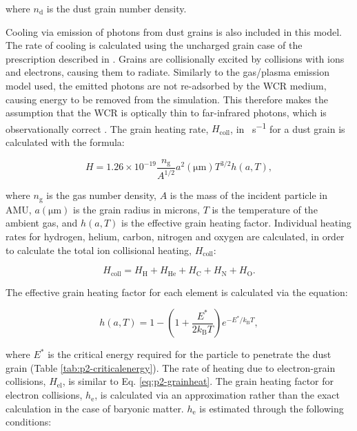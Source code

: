 \documentclass[fleqn,usenatbib]{mnras}
\newcommand{\rms}[1]{\ensuremath{_{\text{#1}}}}
\begin{document}
\noindent
where $n\rms{d}$ is the dust grain number density.

Cooling via emission of photons from dust grains is also included in this model.
The rate of cooling is calculated using the uncharged grain case of the prescription described in \cite{dwek_infrared_1981}.
Grains are collisionally excited by collisions with ions and electrons, causing them to radiate.
Similarly to the gas/plasma emission model used, the emitted photons are not re-adsorbed by the WCR medium, causing energy to be removed from the simulation.
This therefore makes the assumption that the WCR is optically thin to far-infrared photons, which is observationally correct \citep{monnierKeckAperturemaskingExperiment2007,soulainSPHEREViewWolfRayet2018,callinghamAnisotropicWindsWolf2019}.
The grain heating rate, $H\rms{coll}$, in \si{\erg\per\second} for a dust grain is calculated with the formula:

\begin{equation}
  \label{eq:p2-grainheat}
  H = 1.26 \times 10^{-19} \frac{n\rms{g}}{A^{1/2}} a^2(\si{\micro\metre}) T^{3/2} h(a,T) , 
\end{equation}

\noindent
where $n\rms{g}$ is the gas number density,
$A$ is the mass of the incident particle in AMU,
$a(\si{\micro\metre})$ is the grain radius in microns,
$T$ is the temperature of the ambient gas,
and $h(a,T)$ is the effective grain heating factor.
Individual heating rates for hydrogen, helium, carbon, nitrogen and oxygen are calculated, in order to calculate the total ion collisional heating, $H\rms{coll}$:

\begin{equation}
  H\rms{coll} = H\rms H + H \rms{He} + H\rms C + H\rms N + H\rms O .
\end{equation}

\noindent
The effective grain heating factor for each element is calculated via the equation:

\begin{equation}
  h(a,T) = 1 - \left( 1 + \frac{E^*}{2 k\rms{B} T} \right) e^{- E^* / k\rms{B} T} ,
\end{equation}

\noindent
where $E^*$ is the critical energy required for the particle to penetrate the dust grain (Table \ref{tab:p2-criticalenergy}).
The rate of heating due to electron-grain collisions, $H\rms{el}$, is similar to Eq. \ref{eq:p2-grainheat}.
The grain heating factor for electron collisions, $h\rms{e}$, is calculated via an approximation rather than the exact calculation in the case of baryonic matter.
$h\rms{e}$ is estimated through the following conditions:
\end{document}
